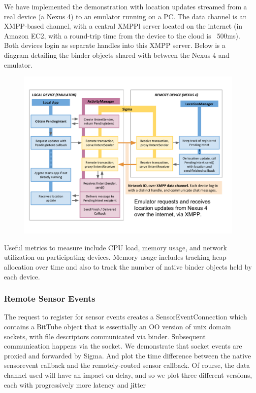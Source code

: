 \documentclass[prodmode]{acmlarge}
\begin{document}
We have implemented the demonstration with location updates streamed from a real device (a Nexus 4) to an emulator running on a PC. The data channel is an XMPP-based channel, with a central XMPPl server located on the internet (in Amazon EC2, with a round-trip time from the device to the cloud is ~500ms). Both devices login as separate handles into this XMPP server.
Below is a diagram detailing the binder objects shared with between the Nexus 4 and emulator.

\begin{figure}[h]
\centering
\includegraphics[width=\textwidth]{drawings/LocationPendingIntentExample.pdf}
\end{figure}

Useful metrics to measure include CPU load, memory usage, and network utilization on participating devices. Memory usage includes tracking heap allocation over time and also to track the number of native binder objects held by each device. 

\subsubsection{Remote Sensor Events}
The request to register for sensor events creates a SensorEventConnection which contains a BitTube object that is essentially an OO version of unix domain sockets, with file descriptors communicated via binder. Subsequent communication happens via the socket. We demonstrate that socket events are proxied and forwarded by Sigma. And plot the time difference between the native sensorevent callback and the remotely-routed sensor callback. Of course, the data channel used will have an impact on delay, and so we plot three different versions, each with progressively more latency and jitter
\end{document}
